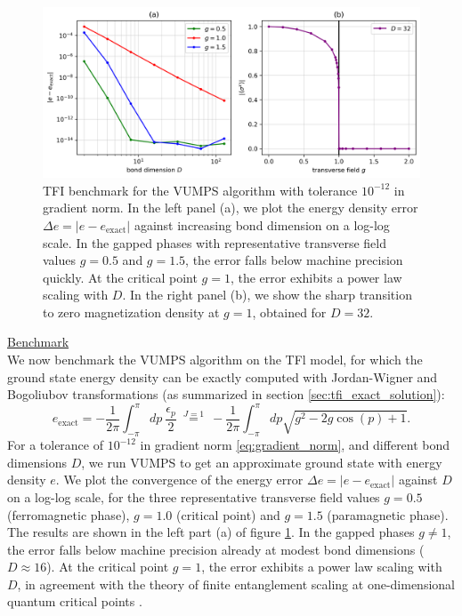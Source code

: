 \begin{figure}[t]
  \centering
  \includegraphics[width=1.0\linewidth]{vumps.png}
  \caption{TFI benchmark for the VUMPS algorithm with tolerance $10^{-12}$ in gradient norm. In the left panel (a), we plot the energy density error $\Delta e = \vert e - e_{\mathrm{exact}} \vert$ against increasing bond dimension on a log-log scale. In the gapped phases with representative transverse field values $g = 0.5$ and $g = 1.5$, the error falls below machine precision quickly. At the critical point $g = 1$, the error exhibits a power law scaling with $D$. In the right panel (b), we show the sharp transition to zero magnetization density at $g= 1$, obtained for $D = 32$.}
 \label{fig:vumps}
\end{figure}
\noindent \underline{Benchmark} \\[0.5em]
\noindent We now benchmark the VUMPS algorithm on the TFl model, for which the ground state energy density can be exactly computed with Jordan-Wigner and Bogoliubov transformations (as summarized in section \ref{sec:tfi_exact_solution}):
\begin{equation}
	e_{\mathrm{exact}} = - \frac{1}{2 \pi} \int_{-\pi}^{\pi} dp \: \frac{\epsilon_p}{2} 
	\:\overset{J=1}{=}\:
	 - \frac{1}{2 \pi} \int_{-\pi}^{\pi} dp \sqrt{g^2 - 2g \cos (p) + 1}.
\end{equation}
For a tolerance of $10^{-12}$ in gradient norm \eqref{eq:gradient_norm}, and different bond dimensions $D$, we run VUMPS to get an approximate ground state with energy density $e$. We plot the convergence of the energy error $\Delta e = \vert e - e_{\mathrm{exact}} \vert$ against $D$ on a log-log scale, for the three representative transverse field values $g = 0.5$ (ferromagnetic phase), $g = 1.0$ (critical point) and $g = 1.5$ (paramagnetic phase). The results are shown in the left part (a) of figure \ref{fig:vumps}. In the gapped phases $g \neq 1$, the error falls below machine precision already at modest bond dimensions ($D \approx 16$). At the critical point $g = 1$, the error exhibits a power law scaling with $D$, in agreement with the theory of finite entanglement scaling at one-dimensional quantum critical points \cite{pollmann2009theory}. \\[0.5em]
